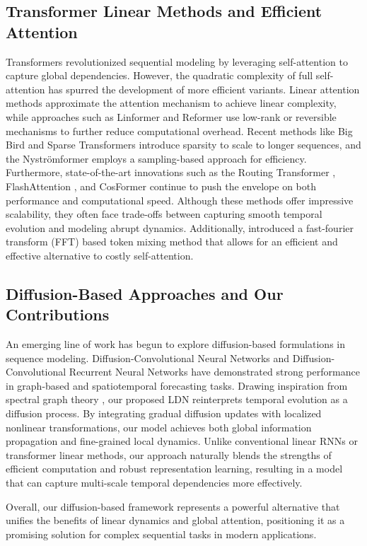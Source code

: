 \subsection{Transformer Linear Methods and Efficient Attention}
Transformers \cite{vaswani2017attention} revolutionized sequential modeling by leveraging self-attention to capture global dependencies. However, the quadratic complexity of full self-attention has spurred the development of more efficient variants. Linear attention methods \cite{katharopoulos2020transformers, choromanski2020rethinking} approximate the attention mechanism to achieve linear complexity, while approaches such as Linformer \cite{wang2020linformer} and Reformer \cite{kitaev2020reformer} use low-rank or reversible mechanisms to further reduce computational overhead. Recent methods like Big Bird \cite{zaheer2020big} and Sparse Transformers \cite{child2019generating} introduce sparsity to scale to longer sequences, and the Nyströmformer \cite{xiong2021nystromformer} employs a sampling-based approach for efficiency. Furthermore, state-of-the-art innovations such as the Routing Transformer \cite{roy2021routing}, FlashAttention \cite{dao2022flashattention}, and CosFormer \cite{zhou2022cosformer} continue to push the envelope on both performance and computational speed. Although these methods offer impressive scalability, they often face trade-offs between capturing smooth temporal evolution and modeling abrupt dynamics. Additionally, \cite{feinashley2025fftstrikesbackefficient} introduced a fast-fourier transform (FFT) based token mixing method that allows for an efficient and effective alternative to costly self-attention.

\subsection{Diffusion-Based Approaches and Our Contributions}
An emerging line of work has begun to explore diffusion-based formulations in sequence modeling. Diffusion-Convolutional Neural Networks \cite{atwood2016diffusion} and Diffusion-Convolutional Recurrent Neural Networks \cite{li2018dcrnn} have demonstrated strong performance in graph-based and spatiotemporal forecasting tasks. Drawing inspiration from spectral graph theory \cite{Chung1997Spectral}, our proposed LDN reinterprets temporal evolution as a diffusion process. By integrating gradual diffusion updates with localized nonlinear transformations, our model achieves both global information propagation and fine-grained local dynamics. Unlike conventional linear RNNs or transformer linear methods, our approach naturally blends the strengths of efficient computation and robust representation learning, resulting in a model that can capture multi-scale temporal dependencies more effectively.

Overall, our diffusion-based framework represents a powerful alternative that unifies the benefits of linear dynamics and global attention, positioning it as a promising solution for complex sequential tasks in modern applications.


